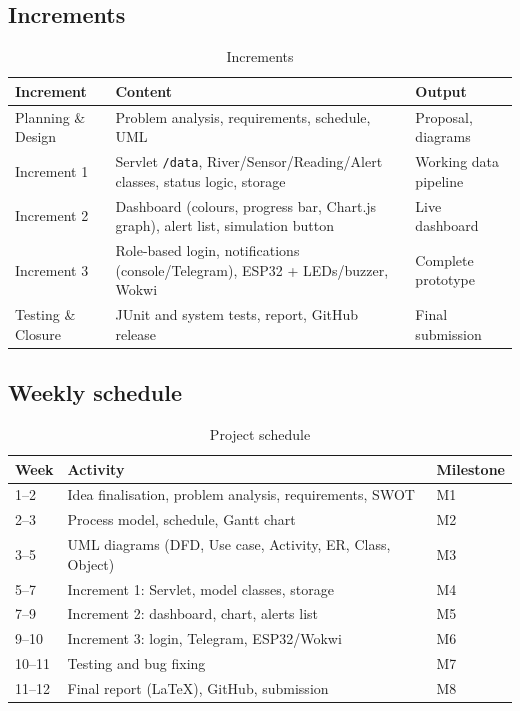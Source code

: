 \documentclass[12pt,a4paper]{article}
\begin{document}
\subsection{Increments}
\begin{table}[H]\centering\small
\begin{tabular}{@{}p{2.2cm}p{7cm}p{5cm}@{}}
\toprule \textbf{Increment} & \textbf{Content} & \textbf{Output}\\\midrule
Planning \& Design & Problem analysis, requirements, schedule, UML & Proposal, diagrams\\
Increment 1 & Servlet \texttt{/data}, River/Sensor/Reading/Alert classes, status logic, storage & Working data pipeline\\
Increment 2 & Dashboard (colours, progress bar, Chart.js graph), alert list, simulation button & Live dashboard\\
Increment 3 & Role-based login, notifications (console/Telegram), ESP32 + LEDs/buzzer, Wokwi & Complete prototype\\
Testing \& Closure & JUnit and system tests, report, GitHub release & Final submission\\\bottomrule
\end{tabular}
\caption{Increments}
\end{table}

\subsection{Weekly schedule}
\begin{table}[H]\centering\small
\begin{tabular}{@{}lp{9.5cm}l@{}}
\toprule \textbf{Week} & \textbf{Activity} & \textbf{Milestone}\\\midrule
1--2 & Idea finalisation, problem analysis, requirements, SWOT & M1\\
2--3 & Process model, schedule, Gantt chart & M2\\
3--5 & UML diagrams (DFD, Use case, Activity, ER, Class, Object) & M3\\
5--7 & Increment 1: Servlet, model classes, storage & M4\\
7--9 & Increment 2: dashboard, chart, alerts list & M5\\
9--10 & Increment 3: login, Telegram, ESP32/Wokwi & M6\\
10--11 & Testing and bug fixing & M7\\
11--12 & Final report (LaTeX), GitHub, submission & M8\\\bottomrule
\end{tabular}
\caption{Project schedule}
\end{table}
\end{document}
